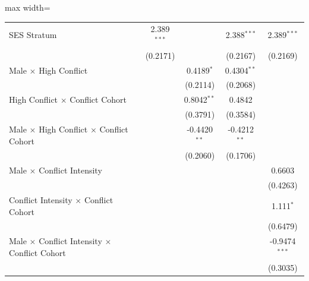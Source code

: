\begin{table}[htbp]
\begin{adjustbox}{max width=\textwidth}
\begin{tabular}{lccccc}
      SES Stratum                                                 &                & 2.389$^{***}$  &                & 2.388$^{***}$  & 2.389$^{***}$\\   
                                                                  &                & (0.2171)       &                & (0.2167)       & (0.2169)\\   
      Male $\times$ High Conflict                                 &                &                & 0.4189$^{*}$   & 0.4304$^{**}$  &   \\   
                                                                  &                &                & (0.2114)       & (0.2068)       &   \\   
      High Conflict $\times$ Conflict Cohort                      &                &                & 0.8042$^{**}$  & 0.4842         &   \\   
                                                                  &                &                & (0.3791)       & (0.3584)       &   \\   
      Male $\times$ High Conflict $\times$ Conflict Cohort        &                &                & -0.4420$^{**}$ & -0.4212$^{**}$ &   \\   
                                                                  &                &                & (0.2060)       & (0.1706)       &   \\   
      Male $\times$ Conflict Intensity                            &                &                &                &                & 0.6603\\   
                                                                  &                &                &                &                & (0.4263)\\   
      Conflict Intensity $\times$ Conflict Cohort                 &                &                &                &                & 1.111$^{*}$\\   
                                                                  &                &                &                &                & (0.6479)\\   
      Male $\times$ Conflict Intensity $\times$ Conflict Cohort   &                &                &                &                & -0.9474$^{***}$\\   
                                                                  &                &                &                &                & (0.3035)\\   

\end{tabular}
\end{adjustbox}
\end{table}
